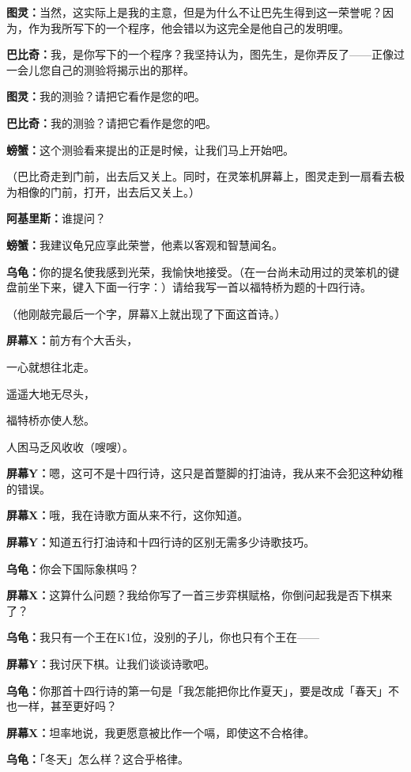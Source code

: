 \documentclass[
  12pt,
  twoside,
  openright,
  oldfontcommands,
]{memoir}
\newcommand{\kaitismall}[1]{{\kaitifamily\small #1}}
\newcommand{\dialogname}[1]{{\heifamily\bfseries #1}}
\begin{document}
\dialogname{图灵：}当然，这实际上是我的主意，但是为什么不让巴先生得到这一荣誉呢？因为，作为我所写下的一个程序，他会错以为这完全是他自己的发明哩。

\dialogname{巴比奇：}我，是你写下的一个程序？我坚持认为，图先生，是你弄反了------正像过一会儿您自己的测验将揭示出的那样。

\dialogname{图灵：}我的测验？请把它看作是您的吧。

\dialogname{巴比奇：}我的测验？请把它看作是您的吧。

\dialogname{螃蟹：}这个测验看来提出的正是时候，让我们马上开始吧。

（巴比奇走到门前，出去后又关上。同时，在灵笨机屏幕上，图灵走到一扇看去极为相像的门前，打开，出去后又关上。）

\dialogname{阿基里斯：}谁提问？

\dialogname{螃蟹：}我建议龟兄应享此荣誉，他素以客观和智慧闻名。

\dialogname{乌龟：}你的提名使我感到光荣，我愉快地接受。\kaitismall{（在一台尚未动用过的灵笨机的键盘前坐下来，键入下面一行字：）}请给我写一首以福特桥为题的十四行诗。

（他刚敲完最后一个字，屏幕X上就出现了下面这首诗。）

\dialogname{屏幕X：}前方有个大舌头，

一心就想往北走。

遥遥大地无尽头，

福特桥亦使人愁。

人困马乏风收收（嗖嗖）。

\dialogname{屏幕Y：}嗯，这可不是十四行诗，这只是首蹩脚的打油诗，我从来不会犯这种幼稚的错误。

\dialogname{屏幕X：}哦，我在诗歌方面从来不行，这你知道。

\dialogname{屏幕Y：}知道五行打油诗和十四行诗的区别无需多少诗歌技巧。

\dialogname{乌龟：}你会下国际象棋吗？

\dialogname{屏幕X：}这算什么问题？我给你写了一首三步弈棋赋格，你倒问起我是否下棋来了？

\dialogname{乌龟：}我只有一个王在K1位，没别的子儿，你也只有个王在------

\dialogname{屏幕Y：}我讨厌下棋。让我们谈谈诗歌吧。

\dialogname{乌龟：}你那首十四行诗的第一句是「我怎能把你比作夏天」，要是改成「春天」不也一样，甚至更好吗？

\dialogname{屏幕X：}坦率地说，我更愿意被比作一个嗝，即使这不合格律。

\dialogname{乌龟：}「冬天」怎么样？这合乎格律。
\end{document}
